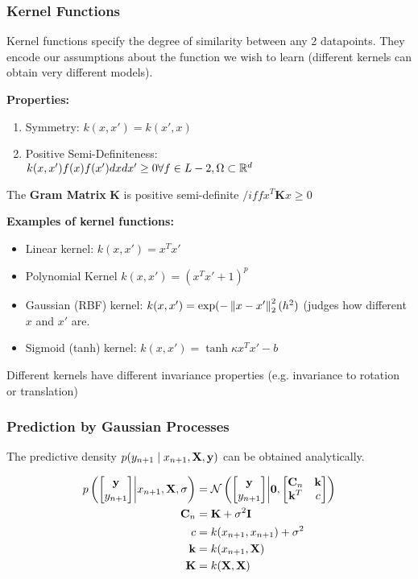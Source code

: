 \subsubsection{Kernel Functions}
Kernel functions specify the degree of similarity between any 2 datapoints. They encode our assumptions about the function we wish to learn (different kernels can obtain very different models).

\textbf{Properties: }
\begin{enumerate}
	\item Symmetry: $k(x,x') = k(x', x)$
	\item Positive Semi-Definiteness: \\
		$k(x,x')f(x)f(x') dxdx' \geq 0 \forall f\in L-2, \Omega\subset \mathbb R^d$
\end{enumerate}

The \textbf{Gram Matrix} $\mathbf K$ is positive semi-definite $/iff x^T\mathbf K x\geq 0$


\textbf{Examples of kernel functions: }
\begin{itemize}
	\item Linear kernel: $k(x,x') = x^Tx'$
	\item Polynomial Kernel $k(x,x') = (x^Tx' + 1)^p$
	\item Gaussian (RBF) kernel: $k(x,x') = \exp(-\left\lVert x-x'\right\rVert_2^2(h^2)$ (judges how different $x$ and $x'$ are.
	\item Sigmoid (tanh) kernel: $k(x,x') = \tanh \kappa x^Tx' - b$
\end{itemize}

Different kernels have different invariance properties (e.g. invariance to rotation or translation)

\subsubsection{Prediction by Gaussian Processes}
The predictive density $p(y_{n+1} \mid x_{n+1}, \mathbf X, \mathbf y)$ can be obtained analytically. 

\begin{align*}
		p\left(
		\begin{bmatrix}
			\mathbf y \\ y_{n+1}	 
		\end{bmatrix}
		\middle\vert
		x_{n+1}, \mathbf X, \sigma
	\right)
	&= \mathcal N
	\left(
		\begin{bmatrix}
			\mathbf y \\ 
			y_{n+1}	 
		\end{bmatrix}	
		\middle\vert
		\mathbf 0,
		\begin{bmatrix}
			\mathbf C_n & \mathbf k \\
			\mathbf k^T & c
		\end{bmatrix}
	\right) \\
	\mathbf C_n &= \mathbf K + \sigma^2\mathbf I \\
	c &= k(x_{n + 1}, x_{n+1}) + \sigma^2 \\
	\mathbf k &= k(x_{n+1}, \mathbf X) \\
	\mathbf K &= k(\mathbf X, \mathbf X)
\end{align*}

